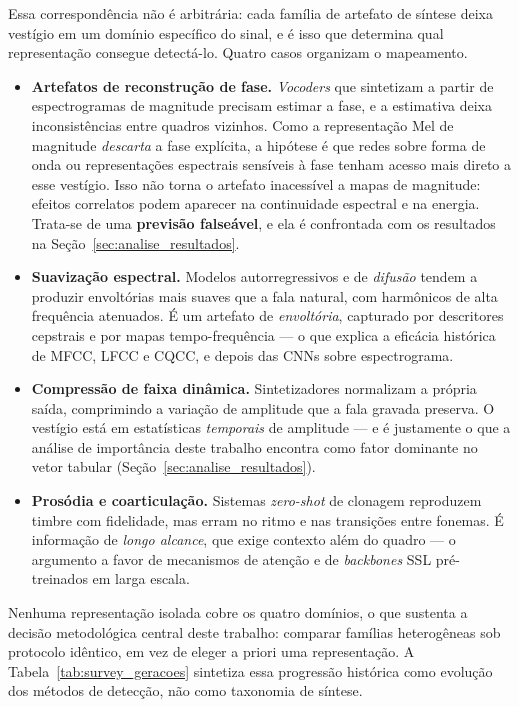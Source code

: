 \documentclass[12pt,a4paper]{article}
\begin{document}
Essa correspondência não é arbitrária: cada família de artefato de síntese
deixa vestígio em um domínio específico do sinal, e é isso que determina qual
representação consegue detectá-lo. Quatro casos organizam o mapeamento.

\begin{itemize}
	\item \textbf{Artefatos de reconstrução de fase.} \textit{Vocoders} que
	sintetizam a partir de espectrogramas de magnitude precisam estimar a fase,
	e a estimativa deixa inconsistências entre quadros vizinhos. Como a
	representação Mel de magnitude \emph{descarta} a fase explícita, a hipótese é
	que redes sobre forma de onda ou representações espectrais sensíveis à fase
	tenham acesso mais direto a esse vestígio. Isso não torna o artefato
	inacessível a mapas de magnitude: efeitos correlatos podem aparecer na
	continuidade espectral e na energia. Trata-se de uma \textbf{previsão falseável}, e ela é
	confrontada com os resultados na Seção~\ref{sec:analise_resultados}.
	\item \textbf{Suavização espectral.} Modelos autorregressivos e de
	\textit{difusão} tendem a produzir envoltórias mais suaves que a fala
	natural, com harmônicos de alta frequência atenuados. É um artefato de
	\emph{envoltória}, capturado por descritores cepstrais e por mapas
	tempo-frequência --- o que explica a eficácia histórica de MFCC, LFCC e
	CQCC, e depois das CNNs sobre espectrograma.
	\item \textbf{Compressão de faixa dinâmica.} Sintetizadores normalizam a
	própria saída, comprimindo a variação de amplitude que a fala gravada
	preserva. O vestígio está em estatísticas \emph{temporais} de amplitude ---
	e é justamente o que a análise de importância deste trabalho encontra como
	fator dominante no vetor tabular (Seção~\ref{sec:analise_resultados}).
	\item \textbf{Prosódia e coarticulação.} Sistemas \textit{zero-shot} de
	clonagem reproduzem timbre com fidelidade, mas erram no ritmo e nas
	transições entre fonemas. É informação de \emph{longo alcance}, que exige
	contexto além do quadro --- o argumento a favor de mecanismos de atenção e
	de \textit{backbones} SSL pré-treinados em larga escala.
\end{itemize}

\noindent
Nenhuma representação isolada cobre os quatro domínios, o que sustenta a
decisão metodológica central deste trabalho: comparar famílias heterogêneas sob
protocolo idêntico, em vez de eleger a priori uma representação. A
Tabela~\ref{tab:survey_geracoes} sintetiza essa progressão histórica como
evolução dos métodos de detecção, não como taxonomia de síntese.
\end{document}

